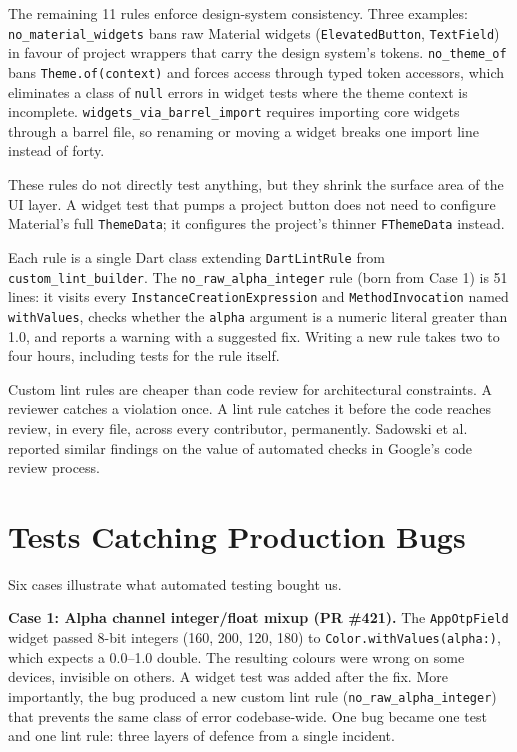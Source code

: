 \documentclass[10pt,journal,compsoc]{IEEEtran}
\begin{document}
The remaining 11 rules enforce design-system consistency. Three examples:
\texttt{no\_material\_widgets} bans raw Material widgets
(\texttt{ElevatedButton}, \texttt{TextField}) in favour of project
wrappers that carry the design system's tokens.
\texttt{no\_theme\_of} bans \texttt{Theme.of(context)} and forces access
through typed token accessors, which eliminates a class of
\texttt{null} errors in widget tests where the theme context is
incomplete.
\texttt{widgets\_via\_barrel\_import} requires importing core widgets
through a barrel file, so renaming or moving a widget breaks one import
line instead of forty.

These rules do not directly test anything, but they shrink the surface
area of the UI layer. A widget test that pumps a project button does not
need to configure Material's full \texttt{ThemeData}; it configures the
project's thinner \texttt{FThemeData} instead.

Each rule is a single Dart class extending \texttt{DartLintRule} from
\texttt{custom\_lint\_builder}. The \texttt{no\_raw\_alpha\_integer} rule
(born from Case 1) is 51 lines: it visits every
\texttt{InstanceCreationExpression} and
\texttt{MethodInvocation} named \texttt{withValues}, checks whether the
\texttt{alpha} argument is a numeric literal greater than 1.0, and
reports a warning with a suggested fix. Writing a new rule takes two to
four hours, including tests for the rule itself.

Custom lint rules are cheaper than code review for architectural
constraints. A reviewer catches a violation once. A lint rule catches it
before the code reaches review, in every file, across every contributor,
permanently.
Sadowski et al.~\cite{sadowski2018lessons} reported similar findings on
the value of automated checks in Google's code review process.


\section{Tests Catching Production Bugs}
\label{sec:regressions}

Six cases illustrate what automated testing bought us.

\textbf{Case 1: Alpha channel integer/float mixup (PR \#421).}
The \texttt{AppOtpField} widget passed 8-bit integers (160, 200, 120, 180)
to \texttt{Color.withValues(alpha:)}, which expects a 0.0--1.0 double. The
resulting colours were wrong on some devices, invisible on others. A widget
test was added after the fix. More importantly, the bug produced a new
custom lint rule (\texttt{no\_raw\_alpha\_integer}) that prevents the same
class of error codebase-wide. One bug became one test and one lint rule:
three layers of defence from a single incident.
\end{document}
